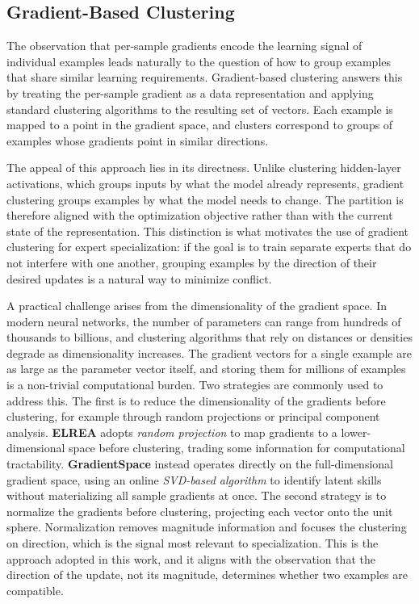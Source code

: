 \subsection{Gradient-Based Clustering}

The observation that per-sample gradients encode the learning signal of individual examples leads naturally to the question of how to group examples that share similar learning requirements. Gradient-based clustering answers this by treating the per-sample gradient as a data representation and applying standard clustering algorithms to the resulting set of vectors. Each example is mapped to a point in the gradient space, and clusters correspond to groups of examples whose gradients point in similar directions.


The appeal of this approach lies in its directness. Unlike clustering hidden-layer activations, which groups inputs by what the model already represents, gradient clustering groups examples by what the model needs to change. The partition is therefore aligned with the optimization objective rather than with the current state of the representation. This distinction is what motivates the use of gradient clustering for expert specialization: if the goal is to train separate experts that do not interfere with one another, grouping examples by the direction of their desired updates is a natural way to minimize conflict.


A practical challenge arises from the dimensionality of the gradient space. In modern neural networks, the number of parameters can range from hundreds of thousands to billions, and clustering algorithms that rely on distances or densities degrade as dimensionality increases. The gradient vectors for a single example are as large as the parameter vector itself, and storing them for millions of examples is a non-trivial computational burden. Two strategies are commonly used to address this. The first is to reduce the dimensionality of the gradients before clustering, for example through random projections or principal component analysis. \textbf{ELREA} adopts \emph{random projection} to map gradients to a lower-dimensional space before clustering, trading some information for computational tractability. \textbf{GradientSpace} instead operates directly on the full-dimensional gradient space, using an online \emph{SVD-based algorithm} to identify latent skills without materializing all sample gradients at once. The second strategy is to normalize the gradients before clustering, projecting each vector onto the unit sphere. Normalization removes magnitude information and focuses the clustering on direction, which is the signal most relevant to specialization. This is the approach adopted in this work, and it aligns with the observation that the direction of the update, not its magnitude, determines whether two examples are compatible.

